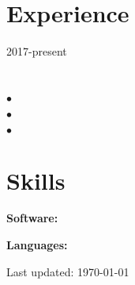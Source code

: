 \documentclass[letterpaper]{article}
\def\footerlink{}
\renewenvironment{itemize}{
  \begin{list}{}{
    \setlength{\leftmargin}{1.5em}
  }
}{
  \end{list}
}
\begin{document}
\vspace{-0.15in}

\section*{Experience}
\begin{itemize}
	\item \textbf{} \hfill {2017-present} \\[-0.25in] %
	\item \textit{} \\[-0.25in]  %
	 \begin{itemize}
 		\setlength{\itemindent}{-.12in}
		\item $\bullet$  \\[-0.2in] 		
		\item $\bullet$  \\[-0.2in]
		\item $\bullet$  \\[-0.2in]
	\end{itemize}
\end{itemize}

\hyphenchar{}
\sloppy

\section*{Skills}
\begin{itemize}
	\item \textbf {Software:} \\[-0.25in]
	\item \textbf {Languages:} 
\end{itemize}


\begin{center}
  \begin{footnotesize}
    Last updated: \today \\
    \href{\footerlink}{\texttt{\footerlink}}
  \end{footnotesize}
\end{center}
\end{document}
